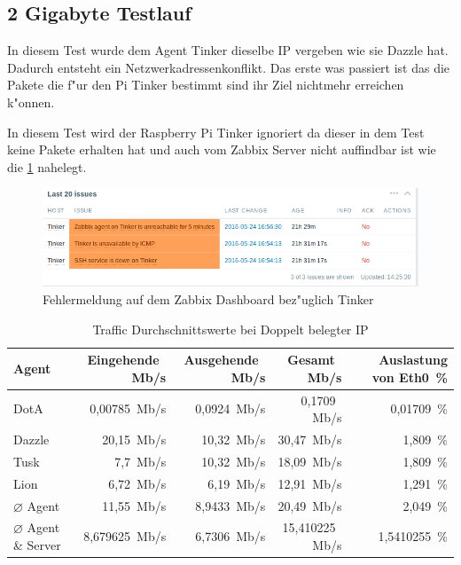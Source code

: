 \subsection{2 Gigabyte Testlauf}
\label{subsec:2GBTest}

In diesem Test wurde dem Agent Tinker dieselbe IP vergeben wie sie Dazzle hat. Dadurch entsteht ein Netzwerkadressenkonflikt. %
Das erste was passiert ist das die Pakete die f"ur den Pi Tinker bestimmt sind ihr Ziel nichtmehr erreichen k"onnen. %

In diesem Test wird der Raspberry Pi Tinker ignoriert da dieser in dem Test keine Pakete erhalten hat und auch vom %
Zabbix Server nicht auffindbar ist wie die \cref{fig:fehlermeldungenTinker} nahelegt.

\begin{figure}[htbp]
\centering
\includegraphics*[width=0.9\linewidth]{Abb/ZabbixTinker/DoppelteIP/TinkerFaults}

\caption{Fehlermeldung auf dem Zabbix Dashboard bez"uglich Tinker}
\label{fig:fehlermeldungenTinker}
\end{figure}

\begin{table}
\centering
\begin{tabular}{l%
 r<{\,Mb/s}%
 r<{\,Mb/s}%
 r<{\,Mb/s}%
 r<{\,\%}%
}
Agent  				& Eingehende		& Ausgehende		& Gesamt		& Auslastung von Eth0	\\
\hline
DotA				& 0,00785		& 0,0924		& 0,1709		&  0,01709 		\\
Dazzle 				& 20,15			& 10,32			& 30,47			& 1,809		\\
Tusk 				& 7,7			& 10,32			& 18,09			& 1,809		\\
Lion				& 6,72			& 6,19			& 12,91			& 1,291		\\
$\diameter $ Agent 		& 11,55 		& 8,9433 		& 20,49			& 2,049 		\\   
$\diameter $ Agent \& Server 	& 8,679625 		& 6,7306		& 15,410225		& 1,5410255		\\

\end{tabular}
\caption{Traffic Durchschnittswerte bei Doppelt belegter IP}
\label{tab:DoppelteIPTraffic}
\end{table}

